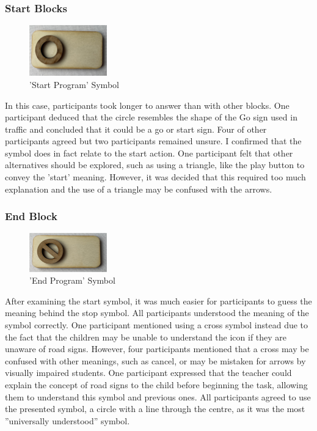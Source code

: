 \documentclass[oneside,%
                    author={Malak Hajji},
                    degree={BSc},
                    title={Designing An Accessible Ozobot Programming Platform for Students},
                  subtitle={With Mixed Visual Abilities}]{dissertation}
\begin{document}
\subsubsection{Start Blocks}
\FloatBarrier
\begin{figure}[h]
    \centering
    \includegraphics[width=0.3\textwidth]{thesis/start.eps}
    \caption{'Start Program' Symbol}
    \label{fig-start-initial}
\end{figure}
\FloatBarrier
In this case, participants took longer to answer than with other blocks. One participant deduced that the circle resembles the shape of the Go sign used in traffic and concluded that it could be a go or start sign. Four of other participants agreed but two participants remained unsure.  I confirmed that the symbol does in fact relate to the start action. One participant felt that other alternatives should be explored, such as using a triangle, like the play button to convey the 'start' meaning. However, it was decided that this required too much explanation and the use of a triangle may be confused with the arrows.

\subsubsection{End Block}

\FloatBarrier
\begin{figure}[h]
    \centering
    \includegraphics[width=0.3\textwidth]{thesis/end.eps}
    \caption{'End Program' Symbol}
    \label{fig-end-initial}
\end{figure}
\FloatBarrier
After examining the start symbol, it was much easier for participants to guess the meaning behind the stop symbol. All participants understood the meaning of the symbol correctly. One participant mentioned using a cross symbol instead due to the fact that the children may be unable to understand the icon if they are unaware of road signs. However, four participants mentioned that a cross may be confused with other meanings, such as cancel, or may be mistaken for arrows by visually impaired students. One participant expressed that the teacher could explain the concept of road signs to the child before beginning the task, allowing them to understand this symbol and previous ones. All participants agreed to use the presented symbol, a circle with a line through the centre, as it was the most ”universally understood” symbol. 
\end{document}
